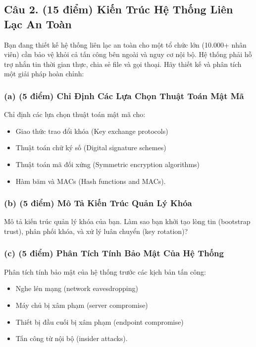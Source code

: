 \subsection{Câu 2. (15 điểm) Kiến Trúc Hệ Thống Liên Lạc An Toàn}

Bạn đang thiết kế hệ thống liên lạc an toàn cho một tổ chức lớn (10.000+ nhân viên) cần bảo vệ khỏi cả tấn công bên ngoài và nguy cơ nội bộ. Hệ thống phải hỗ trợ nhắn tin thời gian thực, chia sẻ file và gọi thoại. Hãy thiết kế và phân tích một giải pháp hoàn chỉnh:

\subsubsection{(a) (5 điểm) Chỉ Định Các Lựa Chọn Thuật Toán Mật Mã}

Chỉ định các lựa chọn thuật toán mật mã cho:
\begin{itemize}
    \item Giao thức trao đổi khóa (Key exchange protocols)
    \item Thuật toán chữ ký số (Digital signature schemes)
    \item Thuật toán mã đối xứng (Symmetric encryption algorithms)
    \item Hàm băm và MACs (Hash functions and MACs).
\end{itemize}

\subsubsection{(b) (5 điểm) Mô Tả Kiến Trúc Quản Lý Khóa}

Mô tả kiến trúc quản lý khóa của bạn. Làm sao bạn khởi tạo lòng tin (bootstrap trust), phân phối khóa, và xử lý luân chuyển (key rotation)?

\subsubsection{(c) (5 điểm) Phân Tích Tính Bảo Mật Của Hệ Thống}

Phân tích tính bảo mật của hệ thống trước các kịch bản tấn công:
\begin{itemize}
    \item Nghe lén mạng (network eavesdropping)
    \item Máy chủ bị xâm phạm (server compromise)
    \item Thiết bị đầu cuối bị xâm phạm (endpoint compromise)
    \item Tấn công từ nội bộ (insider attacks).
\end{itemize}

